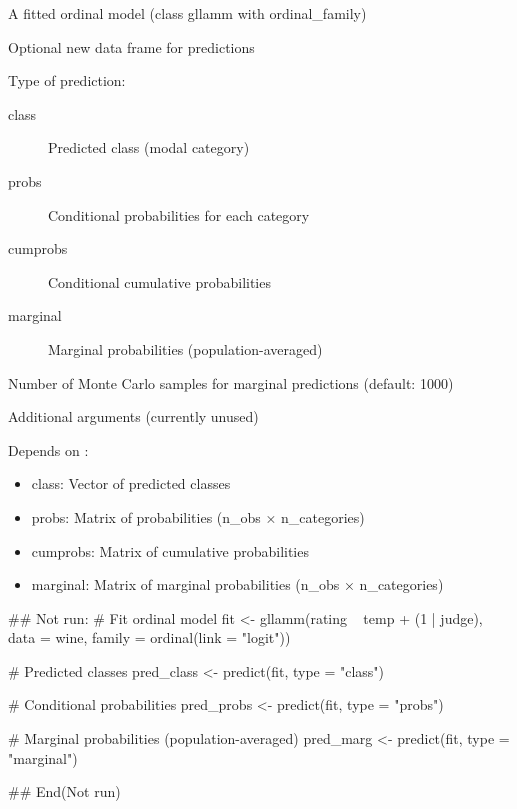 \documentclass[a4paper]{book}
\begin{document}
%
\begin{Arguments}
\begin{ldescription}
\item[\code{object}] A fitted ordinal model (class gllamm with ordinal\_family)

\item[\code{newdata}] Optional new data frame for predictions

\item[\code{type}] Type of prediction:
\begin{description}

\item[class] Predicted class (modal category)
\item[probs] Conditional probabilities for each category
\item[cumprobs] Conditional cumulative probabilities
\item[marginal] Marginal probabilities (population-averaged)

\end{description}


\item[\code{n\_sim}] Number of Monte Carlo samples for marginal predictions (default: 1000)

\item[\code{...}] Additional arguments (currently unused)
\end{ldescription}
\end{Arguments}
%
\begin{Value}
Depends on :
\begin{itemize}

\item{} class: Vector of predicted classes
\item{} probs: Matrix of probabilities (n\_obs × n\_categories)
\item{} cumprobs: Matrix of cumulative probabilities
\item{} marginal: Matrix of marginal probabilities (n\_obs × n\_categories)

\end{itemize}

\end{Value}
%
\begin{Examples}
\begin{ExampleCode}
## Not run: 
# Fit ordinal model
fit <- gllamm(rating ~ temp + (1 | judge),
              data = wine,
              family = ordinal(link = "logit"))

# Predicted classes
pred_class <- predict(fit, type = "class")

# Conditional probabilities
pred_probs <- predict(fit, type = "probs")

# Marginal probabilities (population-averaged)
pred_marg <- predict(fit, type = "marginal")

## End(Not run)

\end{ExampleCode}
\end{Examples}
\end{document}

